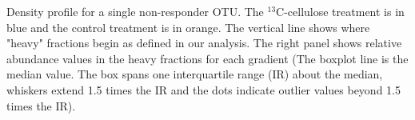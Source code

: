 Density profile for a single non-responder OTU. The $^{13}$C-cellulose treatment is in blue and the control treatment is in orange. The vertical line shows where "heavy" fractions begin as defined in our analysis. The right panel shows relative abundance values in the heavy fractions for each gradient (The boxplot line is the median value. The box spans one interquartile range (IR) about the median, whiskers extend 1.5 times the IR and the dots indicate outlier values beyond 1.5 times the IR).  